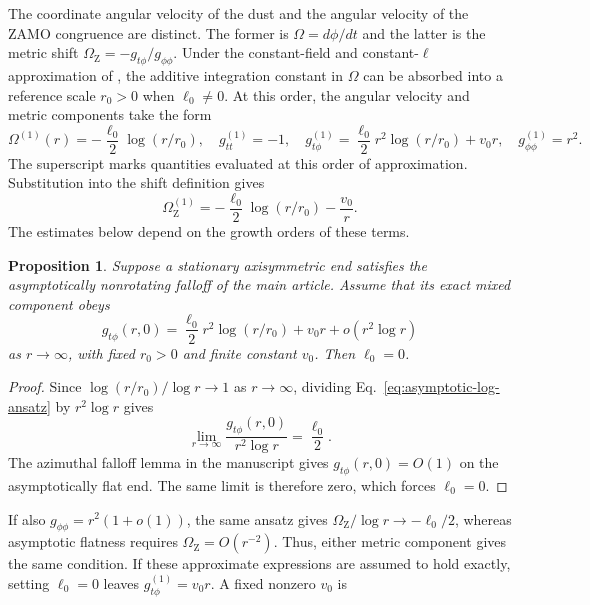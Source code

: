 \documentclass[11pt,a4paper]{article}
\numberwithin{equation}{section}
\theoremstyle{plain}
\newtheorem{proposition}{Proposition}
\theoremstyle{definition}
\theoremstyle{remark}
\newcommand{\ellzero}{\ell_0}
\newcommand{\OmZ}{\Omega_{\mathrm Z}}
\begin{document}
The coordinate angular velocity of the dust and the angular velocity of
the ZAMO congruence are distinct. The former is $\Omega=d\phi/dt$ and the
latter is the metric shift $\OmZ=-g_{t\phi}/g_{\phi\phi}$. Under the constant-field and constant-$\ell$ approximation of \cite{Astesiano2022EPJC}, the additive integration constant in
$\Omega$ can be absorbed into a reference scale $r_0>0$ when
$\ellzero\neq 0$. At this order, the angular velocity and metric components take the form
\begin{equation}
\Omega^{(1)}(r)=-\frac{\ellzero}{2}\log(r/r_0),\quad
g_{tt}^{(1)}=-1,\quad
g_{t\phi}^{(1)}=\frac{\ellzero}{2}r^2\log(r/r_0)+v_0r,\quad
g_{\phi\phi}^{(1)}=r^2.
\end{equation}
The superscript marks quantities evaluated at this order of approximation. Substitution into
the shift definition gives
\begin{equation}\label{eq:logarithmic-zamo-shift}
\OmZ^{(1)}=-\frac{\ellzero}{2}\log(r/r_0)-\frac{v_0}{r}.
\end{equation}
The estimates below depend on the growth orders of these terms.
\begin{proposition}\label{prop:asymptotic-constraint}
Suppose a stationary axisymmetric end satisfies the asymptotically
nonrotating falloff of the main article. Assume that its exact mixed
component obeys
\begin{equation}\label{eq:asymptotic-log-ansatz}
g_{t\phi}(r,0)
=\frac{\ellzero}{2}r^2\log(r/r_0)+v_0r+o(r^2\log r)
\end{equation}
as $r\to\infty$, with fixed $r_0>0$ and finite constant $v_0$. Then $\ellzero=0$.
\end{proposition}
\begin{proof}
Since $\log(r/r_0)/\log r\to 1$ as $r\to\infty$, dividing Eq.~\eqref{eq:asymptotic-log-ansatz} by $r^2\log r$ gives
\begin{equation}
\lim_{r\to\infty}\frac{g_{t\phi}(r,0)}{r^2\log r}=\frac{\ellzero}{2}.
\end{equation}
The azimuthal falloff lemma in the manuscript gives $g_{t\phi}(r,0)=O(1)$ on the asymptotically flat end. The same limit is therefore zero, which forces $\ellzero=0$.
\end{proof}
If also $g_{\phi\phi}=r^2(1+o(1))$, the same ansatz gives
$\OmZ/\log r\to-\ellzero/2$, whereas asymptotic flatness requires
$\OmZ=O(r^{-2})$. Thus, either metric component gives the same condition. If these approximate expressions are assumed to hold exactly, setting
$\ellzero=0$ leaves $g_{t\phi}^{(1)}=v_0r$. A fixed nonzero $v_0$ is
\end{document}
